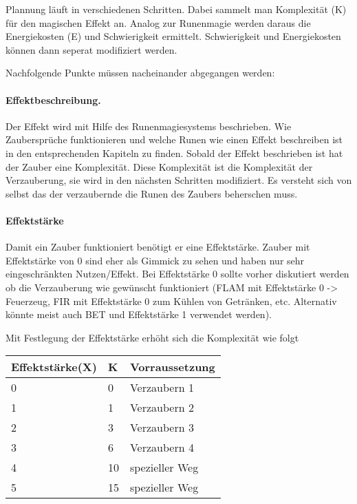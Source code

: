 \documentclass{article}
\begin{document}
Plannung läuft in verschiedenen Schritten. Dabei sammelt man Komplexität (K) für den magischen Effekt an.
Analog zur Runenmagie werden daraus die Energiekosten (E) und Schwierigkeit ermittelt. Schwierigkeit und
Energiekosten können dann seperat modifiziert werden.

Nachfolgende Punkte müssen nacheinander abgegangen werden:

\paragraph{Effektbeschreibung.}

Der Effekt wird mit Hilfe des Runenmagiesystems beschrieben. Wie Zaubersprüche funktionieren und welche Runen wie
einen Effekt beschreiben ist in den entsprechenden Kapiteln zu finden. Sobald der Effekt beschrieben ist hat der
Zauber eine Komplexität. Diese Komplexität ist die Komplexität der Verzauberung, sie wird in den nächsten Schritten
modifiziert. Es versteht sich von selbst das der verzaubernde die Runen des Zaubers beherschen muss.

\paragraph{Effektstärke}

Damit ein Zauber funktioniert benötigt er eine Effektstärke. Zauber mit Effektstärke von 0 sind eher als Gimmick zu
sehen und haben nur sehr eingeschränkten Nutzen/Effekt. Bei Effektstärke 0 sollte vorher diskutiert werden ob die
Verzauberung wie gewünscht funktioniert (FLAM mit Effektstärke 0 -> Feuerzeug, FIR mit Effektstärke 0 zum Kühlen von
Getränken, etc. Alternativ könnte meist auch BET und Effektstärke 1 verwendet werden).

Mit Festlegung der Effektstärke erhöht sich die Komplexität wie folgt


\begin{small}
\begin{tabular}{|m{3cm}|m{1cm}|m{3cm}|}
\hline
\textbf{Effektstärke(X)}&\textbf{K}&\textbf{Vorraussetzung}\\
\hline
\hline
0&0&Verzaubern 1\\
\hline
1&1&Verzaubern 2\\
\hline
2&3&Verzaubern 3\\
\hline
3&6&Verzaubern 4\\
\hline
4&10&spezieller Weg\\
\hline
5&15&spezieller Weg\\
\hline
\end{tabular}
\end{small}
\end{document}
